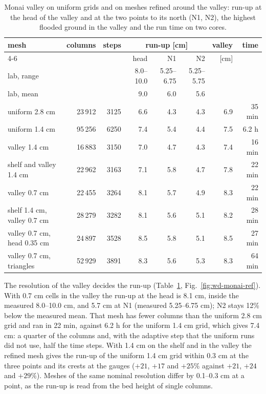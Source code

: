 \begin{table}[htbp]
\centering
\caption{Monai valley on uniform grids and on meshes refined around the
valley: run-up at the head of the valley and at the two points to its north
(N1, N2), the highest flooded ground in the valley and the run time on two
cores.}
\label{tab:wd-monai-ref}
\footnotesize
\setlength{\tabcolsep}{4pt}
\begin{tabular}{lrrrrrrr}
\toprule
mesh & columns & steps & \multicolumn{3}{c}{run-up [cm]} & valley & time \\
\cmidrule(lr){4-6}
 & & & head & N1 & N2 & [cm] & \\
\midrule
lab, range & & & 8.0--10.0 & 5.25--6.75 & 5.25--5.75 & & \\
lab, mean & & & 9.0 & 6.0 & 5.6 & & \\
uniform 2.8 cm & 23\,912 & 3125 & 6.6 & 4.3 & 4.3 & 6.9 & 35 min \\
uniform 1.4 cm & 95\,256 & 6250 & 7.4 & 5.4 & 4.4 & 7.5 & 6.2 h \\
valley 1.4 cm & 16\,883 & 3150 & 7.0 & 4.7 & 4.3 & 7.4 & 16 min \\
shelf and valley 1.4 cm & 22\,962 & 3163 & 7.1 & 5.8 & 4.7 & 7.8 & 22 min \\
valley 0.7 cm & 22\,455 & 3264 & 8.1 & 5.7 & 4.9 & 8.3 & 22 min \\
shelf 1.4 cm, valley 0.7 cm & 28\,279 & 3282 & 8.1 & 5.6 & 5.1 & 8.2 & 28 min \\
valley 0.7 cm, head 0.35 cm & 24\,897 & 3528 & 8.5 & 5.8 & 5.1 & 8.5 & 27 min \\
valley 0.7 cm, triangles & 52\,929 & 3891 & 8.3 & 5.6 & 5.3 & 8.3 & 64 min \\
\bottomrule
\end{tabular}
\end{table}

The resolution of the valley decides the run-up
(Table~\ref{tab:wd-monai-ref}, Fig.~\ref{fig:wd-monai-ref}). With 0.7 cm
cells in the valley the run-up at the head is 8.1 cm, inside the measured
8.0--10.0 cm, and 5.7 cm at N1 (measured 5.25--6.75 cm); N2 stays 12\% below
the measured mean. That mesh has fewer columns than the uniform 2.8 cm grid
and ran in 22 min, against 6.2 h for the uniform 1.4 cm grid, which gives
7.4 cm: a quarter of the columns and, with the adaptive step that the
uniform runs did not use, half the time steps. With 1.4 cm on the shelf and
in the valley the refined mesh gives the run-up of the uniform 1.4 cm grid
within 0.3 cm at the three points and its crests at the gauges ($+21$, $+17$
and $+25\%$ against $+21$, $+24$ and $+29\%$). Meshes of the same nominal
resolution differ by 0.1--0.3 cm at a point, as the run-up is read from the
bed height of single columns.


